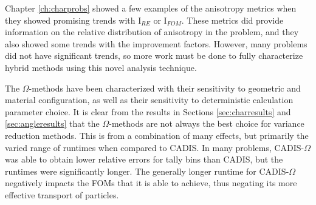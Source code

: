 Chapter \ref{ch:charprobs} showed a few examples of the anisotropy metrics when
they showed promising trends with I$_{RE}$ or I$_{FOM}$. These metrics did
provide information on the relative distribution of anisotropy in the problem,
and they also showed some trends with the improvement factors. However, many
problems did not have significant trends, so more work must be done to fully
characterize hybrid methods using this novel analysis technique.

The $\Omega$-methods have been characterized with their sensitivity to
geometric and material configuration, as well as their sensitivity to
deterministic calculation parameter choice. It is clear from the results in
Sections \ref{sec:charresults} and \ref{sec:angleresults} that the
$\Omega$-methods are not always the best choice for variance reduction methods.
This is from a combination of many effects, but primarily the varied range of
runtimes when compared to CADIS. In many problems, CADIS-$\Omega$ was able to
obtain lower relative errors for tally bins than CADIS, but the runtimes were
significantly longer. The generally longer runtime for CADIS-$\Omega$
negatively impacts the FOMs that it is able to achieve, thus negating its more
effective transport of particles.
